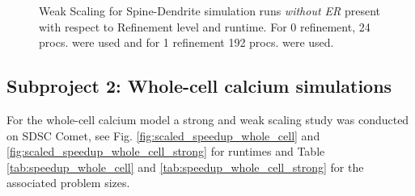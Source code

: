 \begin{figure}[H]
\centering
{}
\caption{Weak Scaling for Spine-Dendrite simulation runs \textit{without ER} present with respect to Refinement level and runtime. For 0 refinement, 24 procs. were used and for 1 refinement 192 procs. were used.}
\label{fig:spindend_weakscale}
\end{figure}


\subsection*{Subproject 2: Whole-cell calcium simulations}

For the whole-cell calcium model a strong and weak scaling study was conducted on
SDSC Comet, see Fig. 
\ref{fig:scaled_speedup_whole_cell} and \ref{fig:scaled_speedup_whole_cell_strong} for runtimes and Table 
\ref{tab:speedup_whole_cell} and \ref{tab:speedup_whole_cell_strong} for the associated problem sizes.

